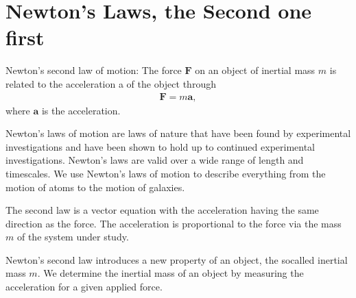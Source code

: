 \documentclass[letterpaper,10pt,english]{sphinxmanual}
\begin{document}
\section{Newton’s Laws, the Second one first}
\label{\detokenize{chapter1:newton-s-laws-the-second-one-first}}
Newton’s second law of motion: The force \(\boldsymbol{F}\) on an object of inertial mass \(m\)
is related to the acceleration a of the object through
\begin{equation*}
\begin{split}
\boldsymbol{F} = m\boldsymbol{a},
\end{split}
\end{equation*}
where \(\boldsymbol{a}\) is the acceleration.

Newton’s laws of motion are laws of nature that have been found by experimental
investigations and have been shown to hold up to continued experimental investigations.
Newton’s laws are valid over a wide range of length\sphinxhyphen{} and time\sphinxhyphen{}scales. We
use Newton’s laws of motion to describe everything from the motion of atoms to the
motion of galaxies.

The second law is a vector equation with the acceleration having the same
direction as the force. The acceleration is proportional to the force via the mass \(m\) of the system under study.

Newton’s second law introduces a new property of an object, the so\sphinxhyphen{}called
inertial mass \(m\). We determine the inertial mass of an object by measuring the
acceleration for a given applied force.
\end{document}
